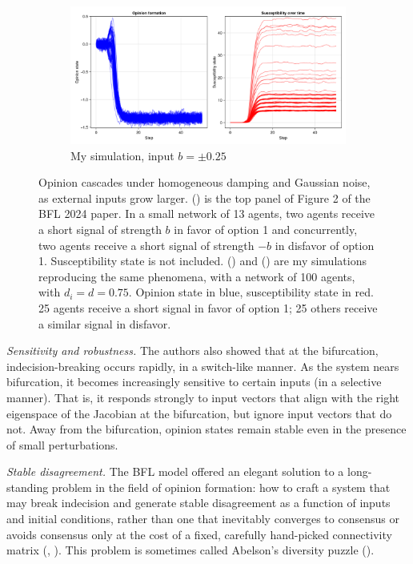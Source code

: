 \documentclass[]{article}
\begin{document}
\begin{figure}
	\begin{subfigure}[t]{0.6\textwidth}
		\centering
		\includegraphics[width=\textwidth]{../plots/old/nog_constd_medsig.png} 
		\caption{My simulation, input $b = \pm 0.25 $} \label{fig:damping3}
	\end{subfigure}
	
	\caption{Opinion cascades under homogeneous damping and Gaussian noise, as external inputs grow larger. () is the top panel of Figure 2 of the BFL 2024 paper. In a small network of 13 agents, two agents receive a short signal of strength $b$ in favor of option 1 and concurrently, two agents receive a short signal of strength $-b$ in disfavor of option 1. Susceptibility state is not included. () and () are my simulations reproducing the same phenomena, with a network of 100 agents, with $d_i=d=0.75$. Opinion state in blue, susceptibility state in red. 25 agents receive a short signal in favor of option 1; 25 others receive a similar signal in disfavor. }\label{fig:replication}
\end{figure}

\textit{Sensitivity and robustness.} The authors also showed that at the bifurcation, indecision-breaking occurs rapidly, in a switch-like manner. As the system nears bifurcation, it becomes increasingly sensitive to certain inputs (in a selective manner). That is, it responds strongly to input vectors that align with the right eigenspace of the Jacobian at the bifurcation, but ignore input vectors that do not. Away from the bifurcation, opinion states remain stable even in the presence of small perturbations.

\textit{Stable disagreement.} The BFL model offered an elegant solution to a long-standing problem in the field of opinion formation: how to craft a system that may break indecision and generate stable disagreement as a function of inputs and initial conditions, rather than one that inevitably converges to consensus or avoids consensus only at the cost of a fixed, carefully hand-picked connectivity matrix (\cite{ravazziDynamicalSocialNetworks2021}, \cite{bernardoBoundedConfidenceOpinion2024}). This problem is sometimes called Abelson's diversity puzzle (\cite{abelsonMathematicalModelsDistribution1964}). 
\end{document}
